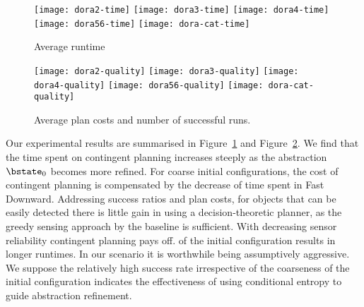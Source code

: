 \begin{figure}[h!]
  \texttt{[image: dora2-time]}\hfill
  \vspace{2mm}
  \texttt{[image: dora3-time]}\hfill
  \vspace{2mm}
  \texttt{[image: dora4-time]}\hfill
  \vspace{2mm}
  \texttt{[image: dora56-time]}\hfill
  \vspace{2mm}
  \texttt{[image: dora-cat-time]}\hfill
  \caption{Average runtime}
  \label{fig:results-time}
\end{figure}

\begin{figure}[h!]
  \texttt{[image: dora2-quality]}\hfill
  \vspace{2mm}
  \texttt{[image: dora3-quality]}\hfill
  \vspace{2mm}
  \texttt{[image: dora4-quality]}\hfill
  \vspace{2mm}
  \texttt{[image: dora56-quality]}\hfill
  \vspace{2mm}
  \texttt{[image: dora-cat-quality]}\hfill
  \caption{Average plan costs and number of successful runs.}
  \label{fig:results-quality}
\end{figure}




Our experimental results are summarised in
Figure~\ref{fig:results-time} and Figure~\ref{fig:results-quality}. We
find that the time spent on contingent planning increases steeply as
the abstraction $\bstate_0$ becomes more refined. For coarse initial
configurations, the cost of contingent planning is compensated by the
decrease of time spent in Fast Downward. Addressing success ratios and
plan costs, for objects that can be easily detected there is little
gain in using a decision-theoretic planner, as the greedy sensing
approach by the baseline is sufficient. With decreasing sensor
reliability contingent planning pays off.%
of the initial configuration results in longer runtimes. In our
scenario it is worthwhile being assumptively aggressive.  We suppose
the relatively high success rate irrespective of the coarseness of the
initial configuration indicates the effectiveness of using conditional
entropy to guide abstraction refinement.

